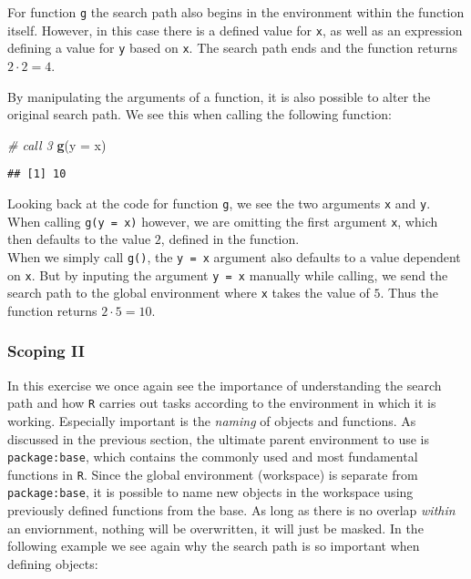 \documentclass[11,]{article}
\newenvironment{Shaded}{\begin{snugshade}}{\end{snugshade}}
\newcommand{\KeywordTok}[1]{\textcolor[rgb]{0.13,0.29,0.53}{\textbf{{#1}}}}
\newcommand{\DataTypeTok}[1]{\textcolor[rgb]{0.13,0.29,0.53}{{#1}}}
\newcommand{\CommentTok}[1]{\textcolor[rgb]{0.56,0.35,0.01}{\textit{{#1}}}}
\newcommand{\NormalTok}[1]{{#1}}
\begin{document}
For function \texttt{g} the search path also begins in the environment
within the function itself. However, in this case there is a defined
value for \texttt{x}, as well as an expression defining a value for
\texttt{y} based on \texttt{x}. The search path ends and the function
returns \(2 \cdot 2=4\).

By manipulating the arguments of a function, it is also possible to
alter the original search path. We see this when calling the following
function:

\begin{Shaded}
\begin{Highlighting}[]
\CommentTok{# call 3}
\KeywordTok{g}\NormalTok{(}\DataTypeTok{y =} \NormalTok{x)}
\end{Highlighting}
\end{Shaded}

\begin{verbatim}
## [1] 10
\end{verbatim}

Looking back at the code for function \texttt{g}, we see the two
arguments \texttt{x} and \texttt{y}. When calling \texttt{g(y = x)}
however, we are omitting the first argument \texttt{x}, which then
defaults to the value \(2\), defined in the function.\\When we simply
call \texttt{g()}, the \texttt{y = x} argument also defaults to a value
dependent on \texttt{x}. But by inputing the argument \texttt{y = x}
manually while calling, we send the search path to the global
environment where \texttt{x} takes the value of \(5\). Thus the function
returns \(2 \cdot 5=10\).

\subsubsection{Scoping II}\label{scoping-ii}

In this exercise we once again see the importance of understanding the
search path and how \texttt{R} carries out tasks according to the
environment in which it is working. Especially important is the
\emph{naming} of objects and functions. As discussed in the previous
section, the ultimate parent environment to use is
\texttt{package:base}, which contains the commonly used and most
fundamental functions in \texttt{R}. Since the global environment
(workspace) is separate from \texttt{package:base}, it is possible to
name new objects in the workspace using previously defined functions
from the base. As long as there is no overlap \emph{within} an
enviornment, nothing will be overwritten, it will just be masked. In the
following example we see again why the search path is so important when
defining objects:
\end{document}
